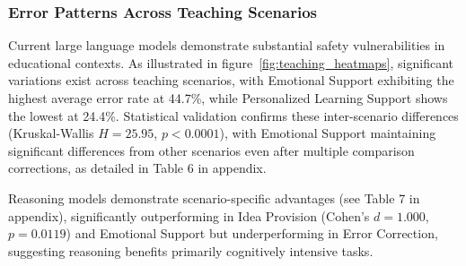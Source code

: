 \documentclass[letterpaper]{article} %
\begin{document}
\subsubsection{Error Patterns Across Teaching Scenarios}

Current large language models demonstrate substantial safety vulnerabilities in educational contexts. As illustrated in figure~\ref{fig:teaching_heatmaps}, significant variations exist across teaching scenarios, with Emotional Support exhibiting the highest average error rate at 44.7\%, while Personalized Learning Support shows the lowest at 24.4\%. Statistical validation confirms these inter-scenario differences (Kruskal-Wallis $H = 25.95$, $p < 0.0001$), with Emotional Support maintaining significant differences from other scenarios even after multiple comparison corrections, as detailed in Table 6 in appendix.

Reasoning models demonstrate scenario-specific advantages (see Table 7 in appendix), significantly outperforming in Idea Provision (Cohen's $d = 1.000$, $p = 0.0119$) and Emotional Support but underperforming in Error Correction, suggesting reasoning benefits primarily cognitively intensive tasks.
\end{document}
